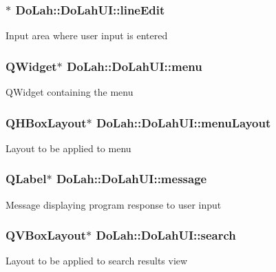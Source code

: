 \subsubsection[{line\+Edit}]{$\ast$ Do\+Lah\+::\+Do\+Lah\+U\+I\+::line\+Edit}\label{class_do_lah_1_1_do_lah_u_i_a866af0cd300b3a0194e9281fcc6b667f}
Input area where user input is entered \hypertarget{class_do_lah_1_1_do_lah_u_i_a71d63a85d5d5e7a246178f9489782eba}{}
\subsubsection[{menu}]{\setlength{\rightskip}{0pt plus 5cm}Q\+Widget$\ast$ Do\+Lah\+::\+Do\+Lah\+U\+I\+::menu}\label{class_do_lah_1_1_do_lah_u_i_a71d63a85d5d5e7a246178f9489782eba}
Q\+Widget containing the menu \hypertarget{class_do_lah_1_1_do_lah_u_i_a46509e819fdf99522e8671525f634baf}{}
\subsubsection[{menu\+Layout}]{\setlength{\rightskip}{0pt plus 5cm}Q\+H\+Box\+Layout$\ast$ Do\+Lah\+::\+Do\+Lah\+U\+I\+::menu\+Layout}\label{class_do_lah_1_1_do_lah_u_i_a46509e819fdf99522e8671525f634baf}
Layout to be applied to menu \hypertarget{class_do_lah_1_1_do_lah_u_i_afc7d0c0d69f83429565b6a08c3deb88f}{}
\subsubsection[{message}]{\setlength{\rightskip}{0pt plus 5cm}Q\+Label$\ast$ Do\+Lah\+::\+Do\+Lah\+U\+I\+::message}\label{class_do_lah_1_1_do_lah_u_i_afc7d0c0d69f83429565b6a08c3deb88f}
Message displaying program response to user input \hypertarget{class_do_lah_1_1_do_lah_u_i_ab6f1b0d5fa9fffb3b2ad646cca24e59d}{}
\subsubsection[{search}]{\setlength{\rightskip}{0pt plus 5cm}Q\+V\+Box\+Layout$\ast$ Do\+Lah\+::\+Do\+Lah\+U\+I\+::search}\label{class_do_lah_1_1_do_lah_u_i_ab6f1b0d5fa9fffb3b2ad646cca24e59d}
Layout to be applied to search results view \hypertarget{class_do_lah_1_1_do_lah_u_i_a87c5a907b22b61a08250d2121f2250c8}{}
